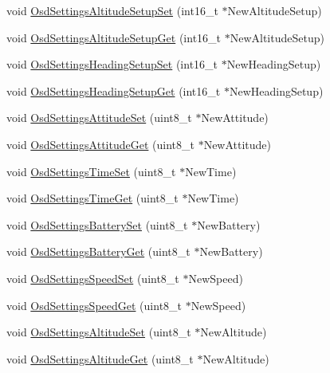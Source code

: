 \begin{DoxyCompactItemize}
void \hyperlink{group___osd_settings_ga50e6eb86498378084f028ec2fa9b9650}{\-Osd\-Settings\-Altitude\-Setup\-Set} (int16\-\_\-t $\ast$\-New\-Altitude\-Setup)
\item 
void \hyperlink{group___osd_settings_gaf1adc0ed90e4e96f7e1d477b7c4a842a}{\-Osd\-Settings\-Altitude\-Setup\-Get} (int16\-\_\-t $\ast$\-New\-Altitude\-Setup)
\item 
void \hyperlink{group___osd_settings_gacf3745f62b184d59565a8dcce9fe2812}{\-Osd\-Settings\-Heading\-Setup\-Set} (int16\-\_\-t $\ast$\-New\-Heading\-Setup)
\item 
void \hyperlink{group___osd_settings_gaad8b2d665dc531cd44e8312a4cd56b8a}{\-Osd\-Settings\-Heading\-Setup\-Get} (int16\-\_\-t $\ast$\-New\-Heading\-Setup)
\item 
void \hyperlink{group___osd_settings_ga7820522281530f05cebedd0dd7fcf8fe}{\-Osd\-Settings\-Attitude\-Set} (uint8\-\_\-t $\ast$\-New\-Attitude)
\item 
void \hyperlink{group___osd_settings_ga14dcc918c1ab8bf31fdf9dbc50cd310d}{\-Osd\-Settings\-Attitude\-Get} (uint8\-\_\-t $\ast$\-New\-Attitude)
\item 
void \hyperlink{group___osd_settings_gaf65e40db900e33ef974973b4293b9419}{\-Osd\-Settings\-Time\-Set} (uint8\-\_\-t $\ast$\-New\-Time)
\item 
void \hyperlink{group___osd_settings_gad07a7b8d6c26530cef0b092918ee88a5}{\-Osd\-Settings\-Time\-Get} (uint8\-\_\-t $\ast$\-New\-Time)
\item 
void \hyperlink{group___osd_settings_ga144908ed6e59d77eb661ec6da1f20e54}{\-Osd\-Settings\-Battery\-Set} (uint8\-\_\-t $\ast$\-New\-Battery)
\item 
void \hyperlink{group___osd_settings_ga9118e36633e1c748fff430c17944ae11}{\-Osd\-Settings\-Battery\-Get} (uint8\-\_\-t $\ast$\-New\-Battery)
\item 
void \hyperlink{group___osd_settings_ga7edfa1b2a8e615cd1d2a888552bc938e}{\-Osd\-Settings\-Speed\-Set} (uint8\-\_\-t $\ast$\-New\-Speed)
\item 
void \hyperlink{group___osd_settings_ga13657354475f3d3f6937a0fcb4e220d7}{\-Osd\-Settings\-Speed\-Get} (uint8\-\_\-t $\ast$\-New\-Speed)
\item 
void \hyperlink{group___osd_settings_ga29c6098d016e426920b5977845a8c6a6}{\-Osd\-Settings\-Altitude\-Set} (uint8\-\_\-t $\ast$\-New\-Altitude)
\item 
void \hyperlink{group___osd_settings_ga32da8c8c569df95a651c95669f978dad}{\-Osd\-Settings\-Altitude\-Get} (uint8\-\_\-t $\ast$\-New\-Altitude)

\end{DoxyCompactItemize}

